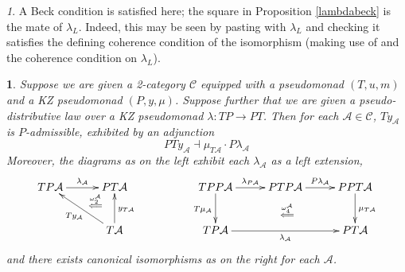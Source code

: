 \documentclass[a4paper,oneside,english]{amsart}
\numberwithin{equation}{section}
\numberwithin{figure}{section}
\theoremstyle{plain}
\theoremstyle{definition}
\theoremstyle{remark}
\newtheorem{rem}[thm]{\protect\remarkname}
\theoremstyle{definition}
\theoremstyle{plain}
\theoremstyle{plain}
\theoremstyle{plain}
\newtheorem{lem}[thm]{\protect\lemmaname}
\providecommand{\lemmaname}{Lemma}
\providecommand{\remarkname}{Remark}
\begin{document}
\begin{rem}
A Beck condition is satisfied here; the square in Proposition \ref{lambdabeck}
is the mate of $\lambda_{L}$. Indeed, this may be seen by pasting
with $\lambda_{L}$ and checking it satisfies the defining coherence
condition of the isomorphism (making use of \cite[Remark 16]{yonedakz}
and the coherence condition on $\lambda_{L}$).\end{rem}
\begin{lem}
\label{w2isext} Suppose we are given a 2-category $\mathscr{C}$
equipped with a pseudomonad $\left(T,u,m\right)$ and a KZ pseudomonad
$\left(P,y,\mu\right)$. Suppose further that we are given a pseudo-distributive
law over a KZ pseudomonad $\lambda\colon TP\to PT$. Then for each
$\mathcal{A}\in\mathscr{C}$, $Ty_{\mathcal{A}}$ is \emph{$P$-}admissible,
exhibited by an adjunction
\[
PTy_{\mathcal{A}}\dashv\mu_{T\mathcal{A}}\cdot P\lambda_{\mathcal{A}}
\]
Moreover, the diagrams as on the left exhibit each $\lambda_{\mathcal{A}}$
as a left extension, 
\[
\xymatrix@=1em{TP\mathcal{A}\ar[rr]^{\lambda_{\mathcal{A}}} &  & PT\mathcal{A}\ar@{}[dl]|-{\stackrel{\omega_{2}^{\mathcal{\mathcal{A}}}}{\Longleftarrow}} &  &  &  & TPP\mathcal{A}\ar[rr]^{\lambda_{P\mathcal{A}}}\ar@{}[rddrrr]|-{\stackrel{\omega_{4}^{\mathcal{\mathcal{A}}}}{\Longleftarrow}}\ar[dd]_{T\mu_{\mathcal{A}}} &  & PTP\mathcal{A}\ar[rr]^{P\lambda_{\mathcal{A}}} &  & PPT\mathcal{A}\ar[dd]^{\mu_{T\mathcal{A}}}\\
 & \;\\
 &  & T\mathcal{A}\ar[uu]_{y_{T\mathcal{A}}}\ar[uull]^{Ty_{\mathcal{A}}} &  &  &  & TP\mathcal{A}\ar[rrrr]_{\lambda_{\mathcal{A}}} &  &  &  & PT\mathcal{A}
}
\]
and there exists canonical isomorphisms as on the right for each $\mathcal{A}$.\end{lem}
\end{document}
